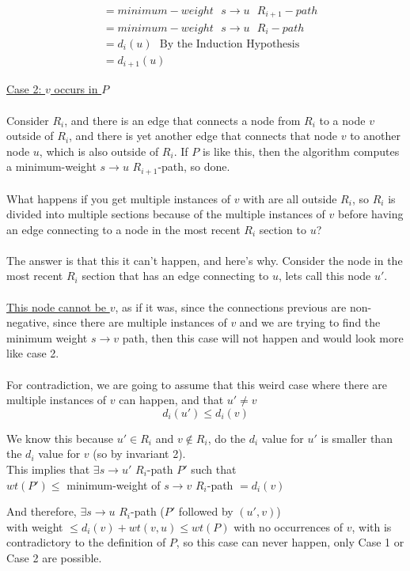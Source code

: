 \documentclass[12pt]{article}
\begin{document}
\begin{align*}
	&= minimum-weight\:\:\: s\rightarrow u\:\:\: R_{i+1}-path\\
	&= minimum-weight\:\:\: s\rightarrow u\:\:\: R_{i}-path\\
	&= d_i (u) \:\:\:\text{By the Induction Hypothesis}\\
	&= d_{i+1} (u)
\end{align*}

\underline{Case 2: $v$ occurs in $P$}\\
\\
Consider $R_i$, and there is an edge that connects a node from $R_i$ to a node $v$ outside of $R_i$, and there is yet another edge that connects that node $v$ to another node $u$, which is also outside of $R_i$. If $P$ is like this, then the algorithm computes a minimum-weight $s\rightarrow u$ $R_{i+1}$-path, so done.\\
\\
What happens if you get multiple instances of $v$ with are all outside $R_i$, so $R_i$ is divided into multiple sections because of the multiple instances of $v$ before having an edge connecting to a node in the most recent $R_i$ section to $u$?\\
\\
The answer is that this it can't happen, and here's why.
Consider the node in the most recent $R_i$ section that has an edge connecting to $u$, lets call this node $u'$.\\
\\
\underline{This node cannot be $v$}, as if it was, since the connections previous are non-negative, since there are multiple instances of $v$ and we are trying to find the minimum weight $s\rightarrow v$ path, then this case will not happen and would look more like case 2.
\\
\\
For contradiction, we are going to assume that this weird case where there are multiple instances of $v$ can happen, and that $u' \neq v$
$$d_i (u') \leq d_i (v)$$

We know this because $u' \in R_i$ and $v \not\in R_i$, do the $d_i$ value for $u'$ is smaller than the $d_i$ value for $v$ (so by invariant 2).\\

This implies that $\exists s\rightarrow u'$ $R_i$-path $P'$ such that\\
$wt(P') \leq $  minimum-weight of $s\rightarrow v$ $R_i$-path $= d_i (v)$

And therefore, $\exists s\rightarrow u$ $R_i$-path ($P'$ followed by $(u',v)$)\\
 with weight $\leq d_i (v) + wt(v,u) \leq wt(P)$ with no occurrences of $v$, with is contradictory to the definition of $P$, so this case can never happen, only Case 1 or Case 2 are possible.
\end{document}
